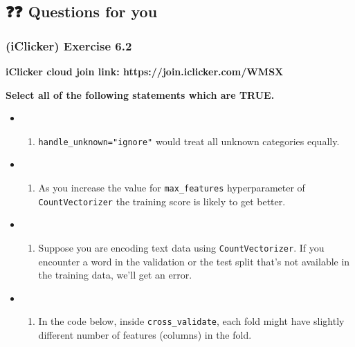 \documentclass[11pt]{article}
\providecommand{\tightlist}{%
      \setlength{\itemsep}{0pt}\setlength{\parskip}{0pt}}
\begin{document}
    

    

    \subsection{❓❓ Questions for you}\label{questions-for-you}

    \subsubsection{(iClicker) Exercise 6.2}\label{iclicker-exercise-6.2}

\textbf{iClicker cloud join link: https://join.iclicker.com/WMSX}

\textbf{Select all of the following statements which are TRUE.}

\begin{itemize}
\tightlist
\item
  \begin{enumerate}
  \def\labelenumi{(\Alph{enumi})}
  \tightlist
  \item
    \texttt{handle\_unknown="ignore"} would treat all unknown categories
    equally.
  \end{enumerate}
\item
  \begin{enumerate}
  \def\labelenumi{(\Alph{enumi})}
  \setcounter{enumi}{1}
  \tightlist
  \item
    As you increase the value for \texttt{max\_features} hyperparameter
    of \texttt{CountVectorizer} the training score is likely to get
    better.
  \end{enumerate}
\item
  \begin{enumerate}
  \def\labelenumi{(\Alph{enumi})}
  \setcounter{enumi}{2}
  \tightlist
  \item
    Suppose you are encoding text data using \texttt{CountVectorizer}.
    If you encounter a word in the validation or the test split that's
    not available in the training data, we'll get an error.
  \end{enumerate}
\item
  \begin{enumerate}
  \def\labelenumi{(\Alph{enumi})}
  \setcounter{enumi}{3}
  \tightlist
  \item
    In the code below, inside \texttt{cross\_validate}, each fold might
    have slightly different number of features (columns) in the fold.
  \end{enumerate}
\end{itemize}
\end{document}
